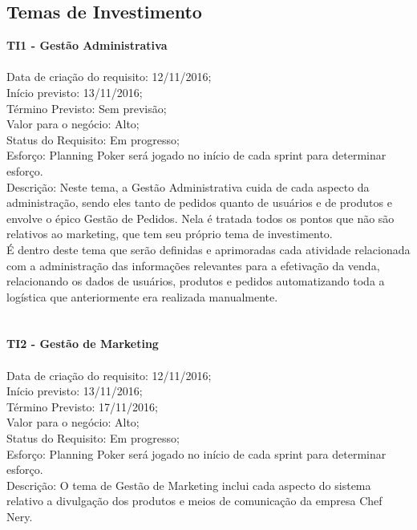 \begin{apendicesenv}
{\large {\subsection { Temas de Investimento\\ } } }


\textbf{TI1 - Gestão Administrativa} \\
\tab \\
\tab Data de criação do requisito: 12/11/2016;\\
\tab Início previsto: 13/11/2016;\\
\tab Término Previsto: Sem previsão;\\
\tab Valor para o negócio: Alto;\\
\tab Status do Requisito: Em progresso;\\
\tab Esforço: Planning Poker será jogado no início de cada sprint para determinar esforço.\\
\tab Descrição: Neste tema, a Gestão Administrativa cuida de cada aspecto da administração, sendo eles tanto de pedidos quanto de usuários e de produtos e envolve o épico Gestão de Pedidos. Nela é tratada todos os pontos que não são relativos ao marketing, que tem seu próprio tema de investimento.\\
\tab É dentro deste tema que serão definidas e aprimoradas cada atividade relacionada com a administração das informações relevantes para a efetivação da venda, relacionando os dados de usuários, produtos e pedidos automatizando toda a logística que anteriormente era realizada manualmente.\\
\\
\tab \\
\textbf{TI2 - Gestão de Marketing} \\
\tab \\
\tab Data de criação do requisito: 12/11/2016;\\
\tab Início previsto: 13/11/2016;\\
\tab Término Previsto: 17/11/2016;\\
\tab Valor para o negócio: Alto;\\
\tab Status do Requisito: Em progresso;\\
\tab Esforço: Planning Poker será jogado no início de cada sprint para determinar esforço.\\
\tab Descrição:  O tema de Gestão de Marketing inclui cada aspecto do sistema relativo a divulgação dos produtos e meios de comunicação da empresa Chef Nery.\\
\\


\end{apendicesenv}
